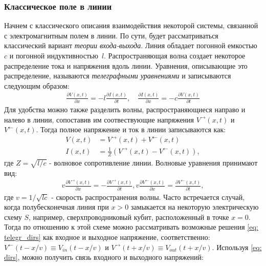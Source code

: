 \subsubsection{Классическое поле в линии}   Начнем с классического описания взаимодействия некоторой системы, связанной с электромагнитным полем в линии. По сути, будет рассматриваться классический вариант \textit{теории входа-выхода}. Линия обладает погонной емкостью $c$ и погонной индуктивностью~$l$. Распространяющая волна создает некоторое распределение тока и напряжения вдоль линии. Уравнения, описывающие это распределение, называются \textit{телеграфными уравнениями} и записываются следующим образом:
\begin{equation}
\begin{split}
\frac{\partial V(x,t) }{\partial x} = -l\frac{\partial I(x,t)}{\partial t},\quad
\frac{\partial I(x,t) }{\partial x} = -c\frac{\partial V(x,t)}{\partial t}
\label{eq: telegr}
\end{split}
\end{equation}
Для удобства можно также разделить волны, распространяющиеся направо и налево в линии, сопоставив им соотвествующие напряжения $V^\rightarrow(x,t)$ и  $V^\leftarrow(x,t)$. Тогда полное напряжение и ток в линии записываются как:
\begin{equation}
\begin{split}
V(x,t) &= V^\rightarrow(x,t) + V^\leftarrow(x,t) \\
I(x,t) &= \frac{1}{Z}(V^\rightarrow(x,t) - V^\leftarrow(x,t)),
\label{eq: dirs}
\end{split}
\end{equation}
где $Z = \sqrt{l/c}$ - волновое сопротивление линии. Волновые уравнения принимают вид:
\begin{equation}
\begin{split}
	v\frac{\partial V^\rightarrow(x,t)}{\partial x} = -\frac{\partial V^\rightarrow(x,t)}{\partial t}, 
	v\frac{\partial V^\leftarrow(x,t)}{\partial x} = \frac{\partial V^\leftarrow(x,t)}{\partial t}, 
	\label{eq: telegr_dirs}
\end{split}
\end{equation}
где $v = 1/\sqrt{lc}$ - скорость распространения волны. 
Часто встречается случай, когда полубесконечная линия при $x>0$ замыкается на некоторую электрическую схему $S$, например, сверхпроводниковый кубит, расположенный в точке $x=0$. Тогда по отношению к этой схеме можно рассматривать возможные решения \eqref{eq: telegr_dirs} как входное и выходное напряжение, соответственно: $V^\leftarrow(t-x/v) \equiv V_{in}(t-x/v)$ и $V^\rightarrow(t+x/v) \equiv V_{out}(t+x/v)$. Используя \eqref{eq: dirs}, можно получить связь входного и выходного напряжений: 
